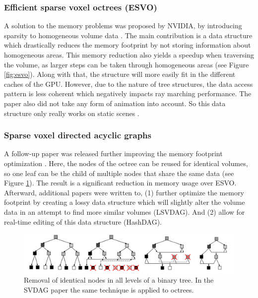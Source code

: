 \subsubsection{Efficient sparse voxel octrees (ESVO)} \label{related_work:voxel_data_structures:esvo}
A solution to the memory problems was proposed by NVIDIA, by introducing sparsity to homogeneous volume data \cite{laine2010efficient}. The main contribution is a data structure which drastically reduces the memory footprint by not storing information about homogeneous areas. This memory reduction also yields a speedup when traversing the volume, as larger steps can be taken through homogeneous areas (see Figure \ref{fig:esvo}). Along with that, the structure will more easily fit in the different caches of the GPU. However, due to the nature of tree structures, the data access pattern is less coherent which negatively impacts ray marching performance. The paper also did not take any form of animation into account. So this data structure only really works on static scenes \cite{JohnLinPerfectEngine}.


\subsubsection{Sparse voxel directed acyclic graphs} \label{related_work:voxel_data_structures:svdag}
A follow-up paper was released further improving the memory footprint optimization \cite{kampe2013high}. Here, the nodes of the octree can be reused for identical volumes, so one leaf can be the child of multiple nodes that share the same data (see Figure \ref{fig:DAG_node_deduplication}). The result is a significant reduction in memory usage over ESVO. Afterward, additional papers were written to, (1) further optimize the memory footprint by creating a lossy data structure which will slightly alter the volume data in an attempt to find more similar volumes \cite{van2020lossy} (LSVDAG). And (2) allow for real-time editing of this data structure \cite{careil2020interactively} (HashDAG).

\begin{figure}
    \centering
    \includegraphics[width=\linewidth]{figures/DAG_node_deduplication.png}
    \caption{Removal of identical nodes in all levels of a binary tree. In the SVDAG paper the same technique is applied to octrees. \cite{kampe2013high}}
    \label{fig:DAG_node_deduplication}
\end{figure}
